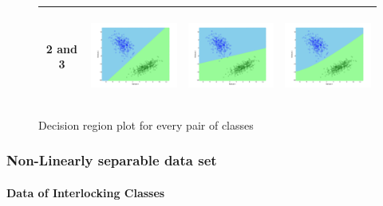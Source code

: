 \documentclass[a4paper]{article}
\begin{document}
\begin{figure}
\begin{tabular}{|c|c|c|c|}
					\hline
					2 and
					3&\includegraphics[width=40mm,height=30mm]{naivebayes/ls/pair/23/all_cov.png}&\includegraphics[width=40mm,height=30mm]{naivebayes/ls/pair/23/avg_cov.png}
					&\includegraphics[width=40mm,height=30mm]{naivebayes/ls/pair/23/diff_cov.png}\\
					\hline
				\end{tabular}
				\caption{Decision region plot for every pair of classes}
			\end{figure}
			
	
	
		\subsubsection{Non-Linearly separable data set }
			
			\paragraph{Data of Interlocking Classes}

			\noindent
			
				
			
\end{document}

